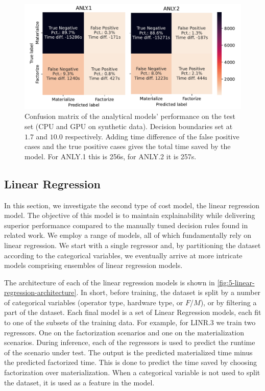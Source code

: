 \begin{figure}[ht]
    \centering
    \includegraphics[width=0.9\linewidth]{chapters/05_cost_estimation/figures/analytical-models-compare.pdf}
    \caption[Analytical Model Confusion Matrix]{Confusion matrix of the analytical models' performance on the test set (CPU and GPU on synthetic data). Decision boundaries set at $1.7$ and $10.0$ respectively. Adding time difference of the false positive cases and the true positive cases gives the total time saved by the model. For ANLY.1 this is 256s, for ANLY.2 it is 257s. }
    \label{fig:5-analytical-model-evaluation}
\end{figure}


\subsection{Linear Regression}
\label{subsec:5-linear-regression}
In this section, we investigate the second type of cost model, the linear regression model. The objective of this model is to maintain explainability while delivering superior performance compared to the manually tuned decision rules found in related work. We employ a range of models, all of which fundamentally rely on linear regression. We start with a single regressor and, by partitioning the dataset according to the categorical variables, we eventually arrive at more intricate models comprising ensembles of linear regression models.

The architecture of each of the linear regression models is shown in \autoref{fig:5-linear-regression-architecture}. In short, before training, the dataset is split by a number of categorical variables (operator type, hardware type, or $F$/$M$), or by filtering a part of the dataset. Each final model is a set of Linear Regression models, each fit to one of the subsets of the training data. For example, for LINR.3 we train two regressors. One on the factorization scenarios and one on the materialization scenarios. During inference, each of the regressors is used to predict the runtime of the scenario under test. The output is the predicted materialized time minus the predicted factorized time. This is done to predict the time saved by choosing factorization over materialization. When a categorical variable is not used to split the dataset, it is used as a feature in the model.

